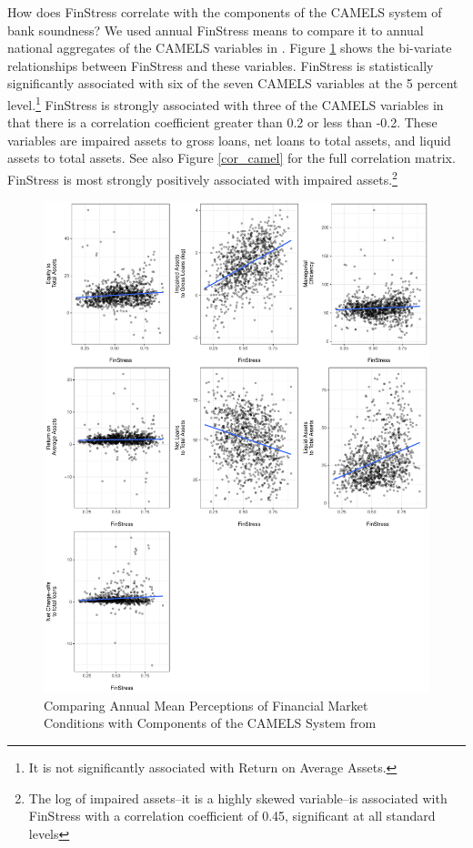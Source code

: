 \documentclass[]{article}
\begin{document}
How does FinStress correlate with the components of the CAMELS system of bank soundness? We used annual FinStress means to compare it to annual national aggregates of the CAMELS variables in \cite{Andrianova2015}. Figure \ref{camel_plot} shows the bi-variate relationships between FinStress and these variables. FinStress is statistically significantly associated with six of the seven CAMELS variables at the 5 percent level.\footnote{It is not significantly associated with Return on Average Assets.} FinStress is strongly associated with three of the CAMELS variables in that there is a correlation coefficient greater than 0.2 or less than -0.2. These variables are impaired assets to gross loans, net loans to total assets, and liquid assets to total assets. See also Figure \ref{cor_camel} for the full correlation matrix. FinStress is most strongly positively associated with impaired assets.\footnote{The log of impaired assets--it is a highly skewed variable--is associated with FinStress with a correlation coefficient of 0.45, significant at all standard levels}

\begin{figure}
	\caption{Comparing Annual Mean Perceptions of Financial Market Conditions with Components of the CAMELS System from \cite{Andrianova2015}}
    \label{camel_plot}
    \begin{center}
		\includegraphics[scale=0.55]{figures/fin_fragility_compare.pdf}
	\end{center}
\end{figure}
\end{document}
